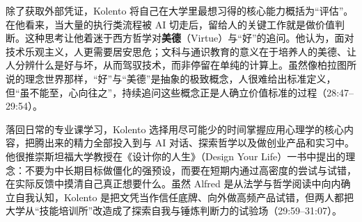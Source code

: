 \documentclass[UTF8,a4paper,11pt,fontset=fandol]{ctexart}
\begin{document}
除了获取外部凭证，Kolento 将自己在大学里最想习得的核心能力概括为“评估”。在他看来，当大量的执行类流程被 AI 切走后，留给人的关键工作就是做价值判断。这种思考让他着迷于西方哲学对\textbf{美德}（Virtue）与“好”的追问。他认为，面对技术乐观主义，人更需要居安思危；文科与通识教育的意义在于培养人的美德、让人分辨什么是好与坏，从而驾驭技术，而非停留在单纯的计算上。虽然像柏拉图所说的理念世界那样，“好”与“美德”是抽象的极致概念，人很难给出标准定义，但“虽不能至，心向往之”，持续追问这些概念正是人确立价值标准的过程（28:47–29:54）。

落回日常的专业课学习，Kolento 选择用尽可能少的时间掌握应用心理学的核心内容，把腾出来的精力全部投入到与 AI 对话、探索哲学以及做创业产品和实习中。他很推崇斯坦福大学教授在《设计你的人生》（Design Your Life）一书中提出的理念：不要为中长期目标做僵化的强预设，而要在短期内通过高密度的尝试与试错，在实际反馈中摸清自己真正想要什么。虽然 Alfred 是从法学与哲学阅读中向内确立自我认知，Kolento 是把文凭当作信任底牌、向外做高频产品试错，但两人都把大学从“技能培训所”改造成了探索自我与锤炼判断力的试验场（29:59–31:07）。
\end{document}
